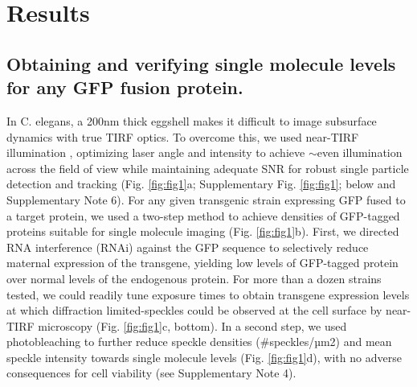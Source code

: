  \section{Results}
 
 \subsection{Obtaining and verifying single molecule levels for any GFP fusion protein.}
 
 In C. elegans, a 200nm thick eggshell \cite{nmeth18,nmeth19} makes it difficult to image subsurface dynamics with true TIRF optics. To overcome this, we used near-TIRF illumination \cite{nmeth20}, optimizing laser angle and intensity to achieve $\sim$even illumination across the field of view while maintaining adequate SNR for robust single particle detection and tracking (Fig. \ref{fig:fig1}a; Supplementary Fig. \ref{fig:fig1}; below and Supplementary Note 6). For any given transgenic strain expressing GFP fused to a target protein, we used a two-step method to achieve densities of GFP-tagged proteins suitable for single molecule imaging (Fig. \ref{fig:fig1}b). First, we directed RNA interference (RNAi) against the GFP sequence to selectively reduce maternal expression of the transgene, yielding low levels of GFP-tagged protein over normal levels of the endogenous protein. For more than a dozen strains tested, we could readily tune exposure times to obtain transgene expression levels at which diffraction limited-speckles could be observed at the cell surface by near-TIRF microscopy (Fig. \ref{fig:fig1}c, bottom). In a second step, we used photobleaching to further reduce speckle densities (\#speckles/µm2) and mean speckle intensity towards single molecule levels (Fig. \ref{fig:fig1}d), with no adverse consequences for cell viability (see Supplementary Note 4).
 
 
 

